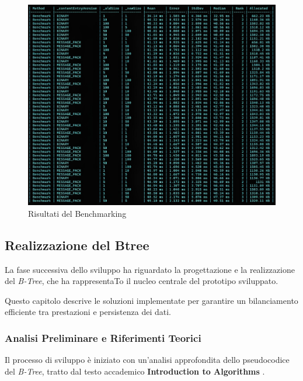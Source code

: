 \documentclass[12pt,a4paper,openright,twoside]{book}
\begin{document}
            \begin{figure} [h]
                \centering
                \includegraphics[width=1\linewidth]{figures/BenchmarkS-D.jpeg}
                \caption{Risultati del Benchmarking}
                \label{fig:serialization}
            \end{figure}

        \clearpage

        \subsection{Realizzazione del Btree}

            La fase successiva dello sviluppo ha riguardato la progettazione e la realizzazione del \textit{B-Tree}, che ha rappresentaTo il nucleo centrale del prototipo sviluppato.

            Questo capitolo descrive le soluzioni implementate per garantire un bilanciamento efficiente tra prestazioni e persistenza dei dati.

            \subsubsection{Analisi Preliminare e Riferimenti Teorici}

                Il processo di sviluppo è iniziato con un'analisi approfondita dello pseudocodice del \textit{B-Tree}, tratto dal testo accademico \textbf{Introduction to Algorithms} \cite{cormen2022introduction}.
\end{document}
